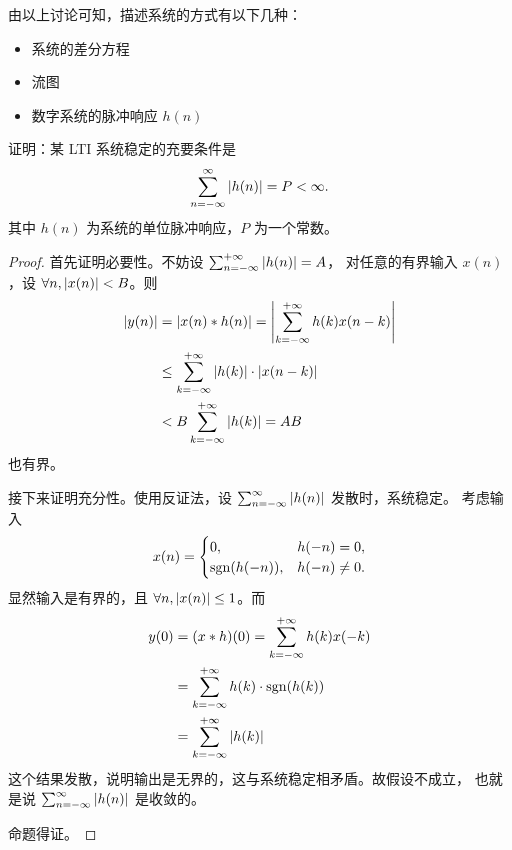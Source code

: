 \begin{remark}
    由以上讨论可知，描述系统的方式有以下几种：
    \begin{itemize}
        \item 系统的差分方程
        \item 流图
        \item 数字系统的脉冲响应 $h(n)$
    \end{itemize}
\end{remark}

\begin{exercise}
    \label{exercise:LTI-stable}
    证明：某 LTI 系统稳定的充要条件是
    \begin{align*}
        \sum_{n = -\infty}^{\infty} \left|h(n)\right| = P < \infty.
    \end{align*}
    其中 $h(n)$ 为系统的单位脉冲响应，$P$ 为一个常数。
\end{exercise}

\begin{proof}
    首先证明必要性。不妨设 $\sum_{n= -\infty}^{+\infty}\left|h(n)\right| = A$，
    对任意的有界输入 $x(n)$，设 $\forall n, \left|x(n)\right| < B$。则
    \begin{align*}
        \left|y(n)\right| & = \left|x(n) * h(n)\right| = \left|\sum_{k = -\infty}^{+\infty}h(k)x(n - k)\right| \\
        & \le \sum_{k = -\infty}^{+\infty} \left|h(k)\right| \cdot \left|x(n - k)\right| \\
        & < B \sum_{k = -\infty}^{+\infty} \left|h(k)\right| = AB
    \end{align*}
    也有界。

    接下来证明充分性。使用反证法，设 $\sum_{n = -\infty}^{\infty} \left|h(n)\right|$ 发散时，系统稳定。
    考虑输入
    \begin{align*}
        x(n) = \begin{cases}
                0, & h(-n) = 0, \\
                \mathrm{sgn}(h(-n)), & h(-n) \neq 0.
            \end{cases}
    \end{align*}
    显然输入是有界的，且 $\forall n, \left|x(n)\right| \le 1$。而
    \begin{align*}
        y(0) & = (x * h)(0) = \sum_{k = -\infty}^{+\infty}h(k)x(-k) \\
        & = \sum_{k = -\infty}^{+\infty}h(k) \cdot \mathrm{sgn}(h(k)) \\
        & = \sum_{k = -\infty}^{+\infty}\left|h(k)\right|
    \end{align*}
    这个结果发散，说明输出是无界的，这与系统稳定相矛盾。故假设不成立，
    也就是说 $\sum_{n = -\infty}^{\infty} \left|h(n)\right|$ 是收敛的。

    命题得证。
\end{proof}


